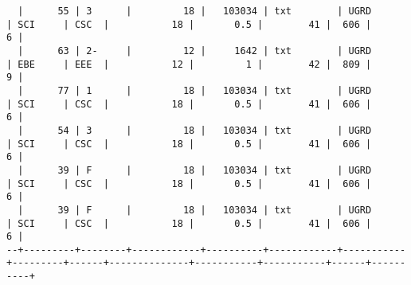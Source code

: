 \begin{sidewaysfigure}
\begin{mdframed}[topline=false,rightline=false,leftline=false]
\begin{BVerbatim}
  |      55 | 3      |         18 |   103034 | txt        | UGRD      | SCI     | CSC  |           18 |       0.5 |        41 |  606 |        6 |
  |      63 | 2-     |         12 |     1642 | txt        | UGRD      | EBE     | EEE  |           12 |         1 |        42 |  809 |        9 |
  |      77 | 1      |         18 |   103034 | txt        | UGRD      | SCI     | CSC  |           18 |       0.5 |        41 |  606 |        6 |
  |      54 | 3      |         18 |   103034 | txt        | UGRD      | SCI     | CSC  |           18 |       0.5 |        41 |  606 |        6 |
  |      39 | F      |         18 |   103034 | txt        | UGRD      | SCI     | CSC  |           18 |       0.5 |        41 |  606 |        6 |
  |      39 | F      |         18 |   103034 | txt        | UGRD      | SCI     | CSC  |           18 |       0.5 |        41 |  606 |        6 |
--+---------+--------+------------+----------+------------+-----------+---------+------+--------------+-----------+-----------+------+----------+
\end{BVerbatim}
  \end{mdframed}
  \caption[Raw Grades CSV Sample]{\textbf{Figure \ref{fig-grades-csv-sample}: Sample of \texttt{Grades (2014 - 2016).CSV} file used for the ETL process, after processing via Microsoft Excel.} Header names have been shortened in some cases for layout-related reasons, and some values have been redacted to ``txt'' for the same reason.}
  \label{fig-grades-csv-sample}
\end{sidewaysfigure}
